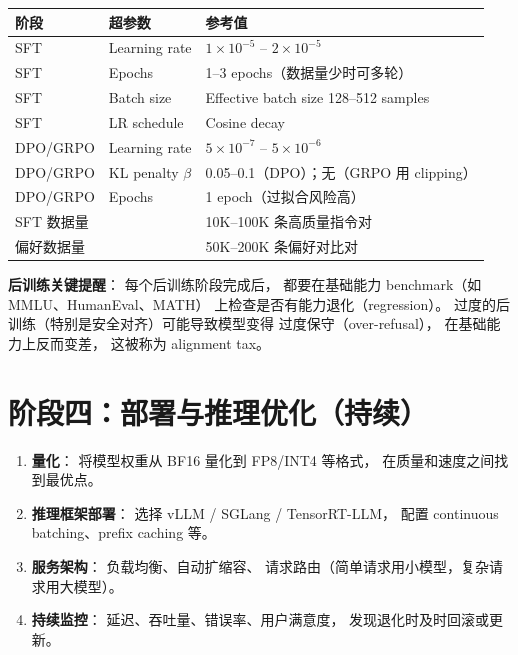 \begin{corebox}[后训练超参数参考]
\begin{tabularx}{\linewidth}{l l X}
\toprule
\textbf{阶段} & \textbf{超参数} & \textbf{参考值} \\
\midrule
SFT & Learning rate & $1 \times 10^{-5}$ -- $2 \times 10^{-5}$ \\
SFT & Epochs        & 1--3 epochs（数据量少时可多轮） \\
SFT & Batch size    & Effective batch size 128--512 samples \\
SFT & LR schedule   & Cosine decay \\
\midrule
DPO/GRPO & Learning rate & $5 \times 10^{-7}$ -- $5 \times 10^{-6}$ \\
DPO/GRPO & KL penalty $\beta$ & 0.05--0.1（DPO）；无（GRPO 用 clipping） \\
DPO/GRPO & Epochs & 1 epoch（过拟合风险高） \\
\midrule
\multicolumn{2}{l}{SFT 数据量} & 10K--100K 条高质量指令对 \\
\multicolumn{2}{l}{偏好数据量} & 50K--200K 条偏好对比对 \\
\bottomrule
\end{tabularx}
\end{corebox}

\textbf{后训练关键提醒}：
每个后训练阶段完成后，
都要在基础能力 benchmark（如 MMLU、HumanEval、MATH）
上检查是否有能力退化（regression）。
过度的后训练（特别是安全对齐）可能导致模型变得
过度保守（over-refusal），
在基础能力上反而变差，
这被称为 alignment tax。

\section{阶段四：部署与推理优化（持续）}

\begin{enumerate}[noitemsep]
  \item \textbf{量化}：
        将模型权重从 BF16 量化到 FP8/INT4 等格式，
        在质量和速度之间找到最优点。
  \item \textbf{推理框架部署}：
        选择 vLLM / SGLang / TensorRT-LLM，
        配置 continuous batching、prefix caching 等。
  \item \textbf{服务架构}：
        负载均衡、自动扩缩容、
        请求路由（简单请求用小模型，复杂请求用大模型）。
  \item \textbf{持续监控}：
        延迟、吞吐量、错误率、用户满意度，
        发现退化时及时回滚或更新。
\end{enumerate}

